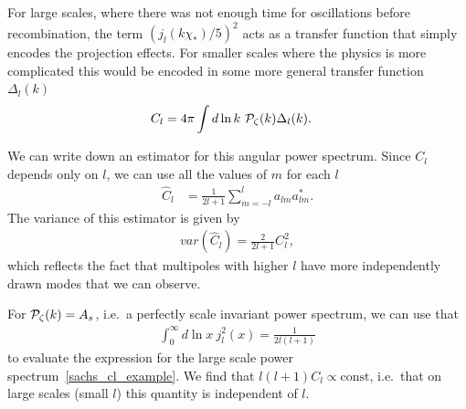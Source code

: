     For large scales, where there was not enough time for oscillations
    before recombination,
    the term $\left(j_l(k\chi_*)/5\right)^2$ acts as a transfer
    function that simply encodes the projection effects.
    For smaller scales where the physics is more complicated this would be encoded in
    some more general transfer function $\Delta_l(k)$
    \begin{align}\label{eqn:transfer_function}
        C_l &= 4\pi\int d\ln k~\mathcal{P}_{\mathcal{\zeta}}(k)
            \Delta_l(k).
    \end{align}


    We can write down an estimator for this angular power spectrum.
    Since $C_l$ depends only on $l$, we can
    use all the values of $m$ for each $l$
    \begin{align}
        \hat{C}_l &= \frac{1}{2l+1}\sum_{m=-l}^{l} a_{lm} a^*_{lm}.
    \end{align}
    The variance of this estimator is given by
    \begin{align}
        var\left(\hat{C}_l\right) = \frac{2}{2l+1} C^2_l,
    \end{align}
    which reflects the fact that multipoles with higher $l$ have
    more independently drawn modes that we can observe.


    For $\mathcal{P}_{\mathcal{\zeta}}(k)=A_s$, i.e.\ a perfectly scale invariant power spectrum,
    we can use that
    \begin{align}
        \int_0^{\infty}d\ln x~j_l^2(x) = \frac{1}{2l(l+1)}
    \end{align}
    to evaluate the expression for the large scale power spectrum~\eqref{sachs_cl_example}.
    We find that $l(l+1)C_l\propto \text{const}$, i.e.\ that on large scales
    (small $l$) this quantity is independent of $l$.




